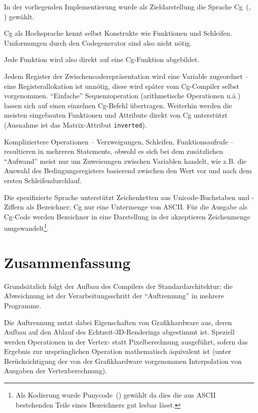 \documentclass[twoside,a4paper,fleqn,12pt]{book}
\begin{document}
In der vorliegenden Implementierung wurde als Zieldarstellung die Sprache Cg~(\cite{cgpaper}, \cite{cg_home}) gewählt.

Cg als Hochsprache kennt selbst Konstrukte wie Funktionen und Schleifen. Umformungen durch den Codegenerator
sind also nicht nötig.

Jede Funktion wird also direkt auf eine Cg-Funktion abgebildet.

Jedem Register der Zwischencoderepräsentation wird eine Variable zugeordnet -- eine Re\-gis\-ter\-al\-lo\-ka\-tion ist unnötig, diese wird später vom Cg-Compiler selbst vorgenommen.
"`Einfache"' Sequenzoperation (arithmetische Operationen u.ä.) lassen sich auf einen einzelnen Cg-Befehl übertragen. 
Weiterhin werden die meisten eingebauten Funktionen und Attribute direkt von Cg unterstützt (Ausnahme ist das Matrix-Attribut \texttt{inverted}).

Kompliziertere Operationen -- Verzweigungen, Schleifen, Funktionsaufrufe -- resultieren in mehreren Statements, obwohl es sich bei dem
zusätzlichen "`Aufwand"' meist nur um Zuweisungen zwischen Variablen handelt, wie z.B. die Auswahl des Bedingungsregisters basierend zwischen
den Wert vor und nach dem ersten Schleifendurchlauf.

Die spezifizierte Sprache unterstützt Zeichenketten aus Unicode-Buchstaben und -Ziffern als Bezeichner;
Cg nur eine Untermenge von ASCII. Für die Ausgabe als Cg-Code werden Bezeichner in eine Darstellung in der akzeptieren
Zeichenmenge umgewandelt\footnote{Als Kodierung wurde Punycode~(\cite{rfc3492}) gewählt da dies die aus ASCII bestehenden Teile eines Bezeichners
gut lesbar lässt.}.


\section{Zusammenfassung}

Grundsätzlich folgt der Aufbau des Compilers der Standardarchitektur; die Abweichnung ist der Verarbeitungsschritt der "`Auftrennung"' in mehrere
Programme.

Die Auftrennung nutzt dabei Eigenschaften von Grafikhardware aus, deren Aufbau auf den Ablauf des Echtzeit-3D-Renderings abgestimmt ist.
Speziell werden Operationen in der Vertex- statt Pixelberechnung ausgeführt, sofern das Ergebnis zur ursprünglichen Operation mathematisch äquivalent ist
(unter Berücksichtigung der von der Grafikhardware vorgenommen Interpolation von Ausgaben der Vertexberechnung).
\end{document}
